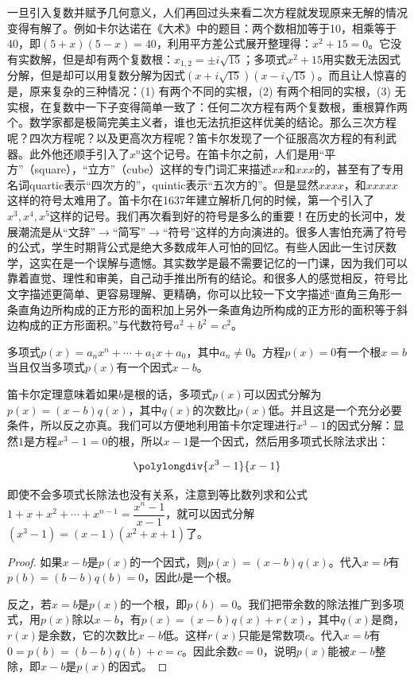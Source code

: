 \documentclass[b5paper]{ctexart}
\begin{document}
一旦引入复数并赋予几何意义，人们再回过头来看二次方程就发现原来无解的情况变得有解了。例如卡尔达诺在《大术》中的题目：两个数相加等于10，相乘等于40，即$(5 + x)(5 - x) = 40$，利用平方差公式展开整理得：$x^2 + 15 = 0$。它没有实数解，但是却有两个复数根：$x_{1,2} = \pm i\sqrt{15}$；多项式$x^2 + 15$用实数无法因式分解，但是却可以用复数分解为因式$(x + i\sqrt{15})(x - i\sqrt{15})$。而且让人惊喜的是，原来复杂的三种情况：(1) 有两个不同的实根，(2) 有两个相同的实根，(3) 无实根，在复数中一下子变得简单一致了：任何二次方程有两个复数根，重根算作两个。数学家都是极简完美主义者，谁也无法抗拒这样优美的结论。那么三次方程呢？四次方程呢？以及更高次方程呢？笛卡尔发现了一个征服高次方程的有利武器。此外他还顺手引入了$x^n$这个记号。在笛卡尔之前，人们是用“平方”（square），“立方”（cube）这样的专门词汇来描述$xx$和$xxx$的，甚至有了专用名词quartic表示“四次方的”，quintic表示“五次方的”。但是显然$xxxx$，和$xxxxx$这样的符号太难用了。笛卡尔在1637年建立解析几何的时候，第一个引入了$x^3, x^4, x^5$这样的记号。我们再次看到好的符号是多么的重要！在历史的长河中，发展潮流是从“文辞”$\to$“简写”$\to$“符号”这样的方向演进的。很多人害怕充满了符号的公式，学生时期背公式是绝大多数成年人可怕的回忆。有些人因此一生讨厌数学，这实在是一个误解与遗憾。其实数学是最不需要记忆的一门课，因为我们可以靠着直觉、理性和审美，自己动手推出所有的结论。和很多人的感觉相反，符号比文字描述更简单、更容易理解、更精确，你可以比较一下文字描述“直角三角形一条直角边所构成的正方形的面积加上另外一条直角边所构成的正方形的面积等于斜边构成的正方形面积。”与代数符号$a^2 + b^2 = c^2$。

\begin{theorem}[笛卡尔]
多项式$p(x) = a_nx^n + \dotsb + a_1x + a_0$，其中$a_n \ne 0$。方程$p(x) = 0$有一个根$x = b$当且仅当多项式$p(x)$有一个因式$x - b$。
\end{theorem}

笛卡尔定理意味着如果$b$是根的话，多项式$p(x)$可以因式分解为$p(x) = (x - b)q(x)$，其中$q(x)$的次数比$p(x)$低。并且这是一个充分必要条件，所以反之亦真。我们可以方便地利用笛卡尔定理进行$x^3 - 1$的因式分解：显然$1$是方程$x^3 - 1 = 0$的根，所以$x - 1$是一个因式，然后用多项式长除法求出：

\[
\polylongdiv{x^3-1}{x-1}
\]

即使不会多项式长除法也没有关系，注意到等比数列求和公式$1 + x + x^2 + \dotsb + x^{n-1} = \dfrac{x^n - 1}{x - 1}$，就可以因式分解$(x^3 - 1) = (x - 1)(x^2 + x + 1)$了。

\begin{proof}
如果$x - b$是$p(x)$的一个因式，则$p(x) = (x - b)q(x)$。代入$x = b$有$p(b) = (b - b)q(b) = 0$，因此$b$是一个根。

反之，若$x = b$是$p(x)$的一个根，即$p(b) = 0$。我们把带余数的除法推广到多项式，用$p(x)$除以$x - b$，有$p(x) = (x - b)q(x) + r(x)$，其中$q(x)$是商，$r(x)$是余数，它的次数比$x - b$低。这样$r(x)$只能是常数项$c$。代入$x = b$有$0 = p(b) = (b - b)q(b) + c = c$。因此余数$c = 0$，说明$p(x)$能被$x - b$整除，即$x - b$是$p(x)$的因式。
\end{proof}
\end{document}
